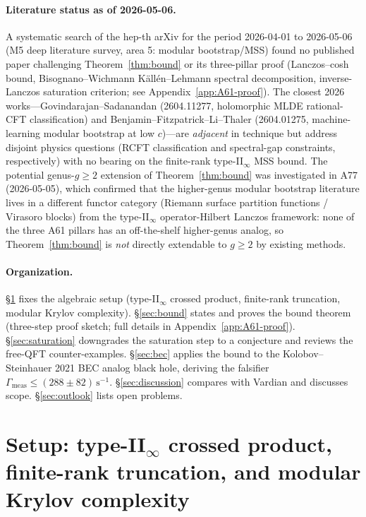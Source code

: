 \documentclass[12pt,a4paper]{article}
\begin{document}
\paragraph{Literature status as of 2026-05-06.}
A systematic search of the hep-th arXiv for the period 2026-04-01 to
2026-05-06 (M5 deep literature survey, area 5: modular bootstrap/MSS)
found no published paper challenging Theorem~\ref{thm:bound} or its
three-pillar proof (Lanczos--cosh bound, Bisognano--Wichmann
K\"{a}ll\'{e}n--Lehmann spectral decomposition, inverse-Lanczos
saturation criterion; see Appendix~\ref{app:A61-proof}).
The closest 2026 works---Govindarajan--Sadanandan (2604.11277, holomorphic
MLDE rational-CFT classification) and Benjamin--Fitzpatrick--Li--Thaler
(2604.01275, machine-learning modular bootstrap at low $c$)---are
\emph{adjacent} in technique but address disjoint physics questions (RCFT
classification and spectral-gap constraints, respectively) with no
bearing on the finite-rank type-II$_\infty$ MSS bound.
The potential genus-$g \ge 2$ extension of Theorem~\ref{thm:bound} was
investigated in A77 (2026-05-05), which confirmed that the higher-genus
modular bootstrap literature lives in a different functor category (Riemann
surface partition functions / Virasoro blocks) from the type-II$_\infty$
operator-Hilbert Lanczos framework: none of the three A61 pillars has an
off-the-shelf higher-genus analog, so Theorem~\ref{thm:bound} is
\emph{not} directly extendable to $g \ge 2$ by existing methods.

\paragraph{Organization.}
\S\ref{sec:setup} fixes the algebraic setup (type-II$_\infty$ crossed
product, finite-rank truncation, modular Krylov complexity).
\S\ref{sec:bound} states and proves the bound theorem (three-step proof
sketch; full details in Appendix~\ref{app:A61-proof}).
\S\ref{sec:saturation} downgrades the saturation step to a conjecture
and reviews the free-QFT counter-examples.
\S\ref{sec:bec} applies the bound to the Kolobov--Steinhauer 2021
BEC analog black hole, deriving the falsifier
$\Gamma_{\mathrm{meas}} \le (288 \pm 82)\,\mathrm{s}^{-1}$.
\S\ref{sec:discussion} compares with Vardian and discusses scope.
\S\ref{sec:outlook} lists open problems.

\section{Setup: type-II$_\infty$ crossed product, finite-rank truncation,
         and modular Krylov complexity}
\label{sec:setup}
\end{document}
